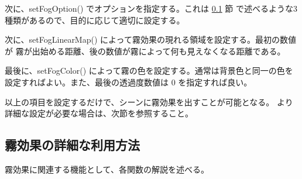 次に、setFogOption() でオプションを指定する。これは \ref{subsec:scenefogref} 節
で述べるような3種類があるので、目的に応じて適切に設定する。

次に、setFogLinearMap() によって霧効果の現れる領域を設定する。最初の数値が
霧が出始める距離、後の数値が霧によって何も見えなくなる距離である。

最後に、setFogColor() によって霧の色を設定する。通常は背景色と同一の色を
設定すればよい。また、最後の透過度数値は 0 を指定すれば良い。

以上の項目を設定するだけで、シーンに霧効果を出すことが可能となる。
より詳細な設定が必要な場合は、次節を参照すること。
\subsection{霧効果の詳細な利用方法} \label{subsec:scenefogref}
霧効果に関連する機能として、各関数の解説を述べる。
